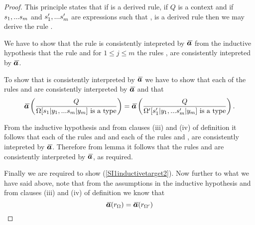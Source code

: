 \begin{proof}
This principle states that if  is a derived rule, if $Q$ is a context and if  $s_1,...s_{m}$ and $s'_1,...s'_{m}$ are expressions such that \foreachj,  is a derived rule then we may derive the rule \SIoneconclusion. 

We have to show that the rule \SIoneconclusion is consistently intepreted by $\Ibar$
from the inductive hypothesis  that the rule 
and for $1 \leq j \leq m$ the rules ,  are consistently intepreted by $\Ibar$.

To show that \SIoneconclusion is consistently interpreted by $\Ibar$
we have to show that each of the rules \SIoneconclusionlhs and \SIoneconclusionrhs
are consistently interpreted by $\Ibar$ and that
\begin{equation}
\label{SI1inductivetarget2}
\ibarmappedrule{Q}{\isT{\Omega[\SUBsFORy{m}]}} = \ibarmappedrule{Q}{\isT{\Omega'[\SUBspFORy{m}]}}.
\end{equation}

From the  inductive hypothesis  and from clauses (iii) and (iv) of definition  it follows that
each of the rules
\SIonesourcelhs
and
\SIonesourcerhs
and each of the rules
and
\wherej, are consistently intepreted by $\Ibar$. 
Therefore from lemma  it follows that
 the rules \SIoneconclusionlhs and \SIoneconclusionrhs
are consistently interpreted by $\Ibar$, as required.

Finally we are required to show  (\ref{SI1inductivetarget2}).
Now further to what we have said above, note that from the assumptions in the inductive hypothesis 
and from clauses (iii) and (iv) of definition  we know that
\begin{equation}
\label{SI1inductiveequation1}
\Ibar(r_\Omega)=\Ibar(r_{\Omega'})
\end{equation}


\end{proof}
